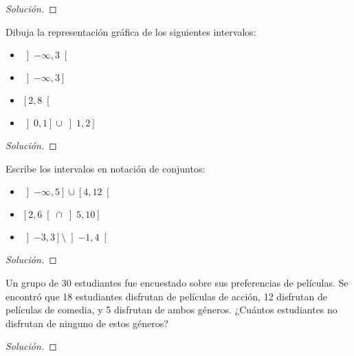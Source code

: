 \documentclass[a4,11pt]{aleph-notas}
\begin{document}
\begin{proof}[Solución]\hspace{0pt}
    
\end{proof}

\begin{ejer}
    Dibuja la representación gráfica de los siguientes intervalos:
    \begin{itemize}
        \item 
        $\left]-\infty, 3\right[$
        \item 
        $\left]-\infty, 3\right]$
        \item 
        $\left[2, 8\right[$
        \item 
        $\left]0, 1\right] \cup \left]1, 2\right]$
    \end{itemize}
\end{ejer}

\begin{proof}[Solución]\hspace{0pt}
    
\end{proof}

\begin{ejer}
    Escribe los intervalos en notación de conjuntos:
    \begin{itemize}
        \item 
        $\left]-\infty, 5\right] \cup \left[4, 12\right[$
        \item 
        $\left[2, 6\right[ \cap \left]5, 10\right]$
        \item 
        $\left]-3, 3\right] \setminus \left]-1, 4\right[$
    \end{itemize}
\end{ejer}

\begin{proof}[Solución]\hspace{0pt}
    
\end{proof}

\begin{ejer}
    Un grupo de 30 estudiantes fue encuestado sobre sus preferencias de películas. Se encontró que 18 estudiantes disfrutan de películas de acción, 12 disfrutan de películas de comedia, y 5 disfrutan de ambos géneros. ¿Cuántos estudiantes no disfrutan de ninguno de estos géneros?
\end{ejer}

\begin{proof}[Solución]\hspace{0pt}
    
\end{proof}
\end{document}
